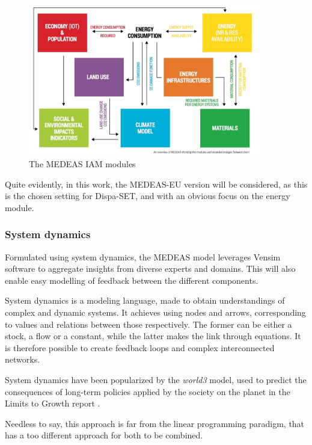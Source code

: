 \begin{figure}[h]
    \centering
    \includegraphics[width=0.9\textwidth]{resources/images/medeas.png}
    \caption{The MEDEAS IAM modules}
    \label{fig:medeas-modules}
\end{figure}

Quite evidently, in this work, the MEDEAS-EU version will be considered, as this is the chosen setting for Dispa-SET, and with an obvious focus on the energy module. 

\subsubsection{System dynamics}

Formulated using system dynamics, the MEDEAS model leverages Vensim software to aggregate insights from diverse experts and domains. This will also enable easy modelling of feedback between the different components.

System dynamics is a modeling language, made to obtain understandings of complex and dynamic systems. It achieves using nodes and arrows, corresponding to values and relations between those respectively. The former can be either a stock, a flow or a constant, while the latter makes the link through equations. It is therefore possible to create feedback loops and complex interconnected networks.

System dynamics have been popularized by the \textit{world3} model, used to predict the consequences of long-term policies applied by the society on the planet in the Limits to Growth report \cite{limits-to-growth}.

Needless to say, this approach is far from the linear programming paradigm, that has a too different approach for both to be combined.

